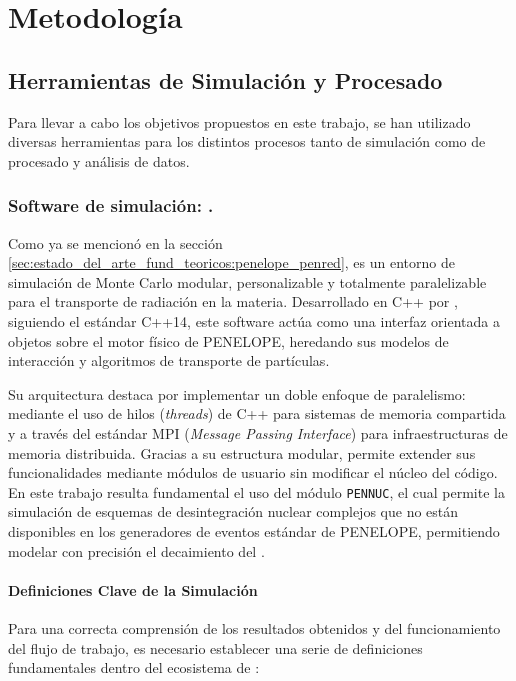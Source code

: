 \chapter{Metodología}
\label{cap:metodologia}

\section{Herramientas de Simulación y Procesado}
\label{sec:metodologia:herramientas}

Para llevar a cabo los objetivos propuestos en este trabajo, se han utilizado diversas herramientas para los distintos procesos tanto de simulación como de procesado y análisis de datos.

\subsection{Software de simulación: \penred.}

Como ya se mencionó en la sección \ref{sec:estado_del_arte_fund_teoricos:penelope_penred}, \penred es un entorno de simulación de Monte Carlo modular, personalizable y totalmente paralelizable para el transporte de radiación en la materia. Desarrollado en C++ por \citeauthor{Gimnez-Alventosa2021}, siguiendo el estándar C++14, este software actúa como una interfaz orientada a objetos sobre el motor físico de PENELOPE, heredando sus modelos de interacción y algoritmos de transporte de partículas.

Su arquitectura destaca por implementar un doble enfoque de paralelismo: mediante el uso de hilos (\textit{threads}) de C++ para sistemas de memoria compartida y a través del estándar MPI (\emph{Message Passing Interface}) para infraestructuras de memoria distribuida. Gracias a su estructura modular, \penred permite extender sus funcionalidades mediante módulos de usuario sin modificar el núcleo del código. En este trabajo resulta fundamental el uso del módulo \texttt{PENNUC}, el cual permite la simulación de esquemas de desintegración nuclear complejos que no están disponibles en los generadores de eventos estándar de PENELOPE, permitiendo modelar con precisión el decaimiento del \yochoseis.

\subsubsection{Definiciones Clave de la Simulación}

Para una correcta comprensión de los resultados obtenidos y del funcionamiento del flujo de trabajo, es necesario establecer una serie de definiciones fundamentales dentro del ecosistema de \penred:

